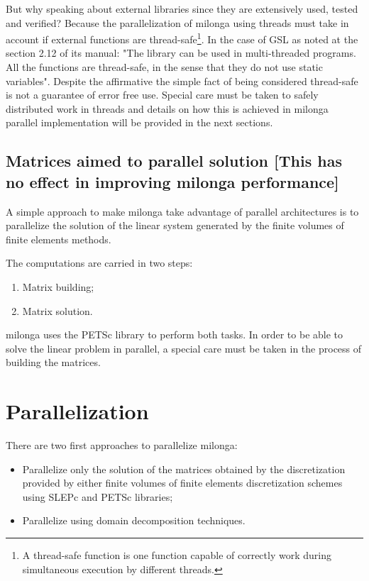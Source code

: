 \documentclass{anstrans}
\begin{document}
But why speaking about external libraries since they are extensively used, tested and verified? Because
the parallelization of milonga using threads must take in account if external functions are
thread-safe\footnote{A thread-safe function is one function capable of correctly work during simultaneous
  execution by different threads.}. In the case of GSL as noted at the section 2.12 of its manual: "The library can be used in multi-threaded programs. All the functions are thread-safe, in the sense that they do not use static variables". Despite the affirmative the
simple fact of being considered thread-safe is not a guarantee of error free use. Special care must be taken to safely
distributed work in threads and details on how this is achieved in milonga parallel implementation will be provided
in the next sections.

\subsection{Matrices aimed to parallel solution [This has no effect in improving milonga performance]}
A simple approach to make milonga take advantage of parallel architectures is to parallelize the
solution of the linear system generated by the finite volumes of finite elements methods.

The computations are carried in two steps:
\begin{enumerate}
\item Matrix building;
  \item Matrix solution.
\end{enumerate}

milonga uses the PETSc library to perform both tasks. In order to be able to solve the linear problem
in parallel, a special care must be taken in the process of building the matrices.

\section{Parallelization}

There are two first approaches to parallelize milonga:
\begin{itemize}
\item Parallelize only the solution of the matrices obtained by the discretization
  provided by either finite volumes of finite elements discretization schemes using
  SLEPc and PETSc libraries;
\item Parallelize using domain decomposition techniques.
\end{itemize}
\end{document}
